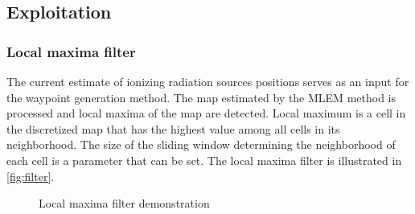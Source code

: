 \subsection{Exploitation}
\subsubsection{Local maxima filter}
The current estimate of ionizing radiation sources positions serves as an input for the waypoint generation method.
The map estimated by the \ac{MLEM} method is processed and local maxima of the map are detected.
Local maximum is a cell in the discretized map that has the highest value among all cells in its neighborhood. 
The size of the sliding window determining the neighborhood of each cell is a parameter that can be set.
The local maxima filter is illustrated in  \autoref{fig:filter}.

\begin{figure}[!htb]
  \centering
  \caption{Local maxima filter demonstration}
  \label{fig:filter}
\end{figure}%

